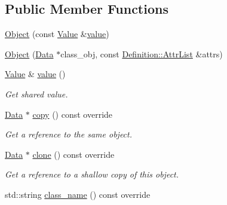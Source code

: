 \subsection*{Public Member Functions}
\begin{DoxyCompactItemize}
\item 
\hyperlink{classcreek_1_1_object_acdd6c54b973ad7facea8426ec61fbc57}{Object} (const \hyperlink{classcreek_1_1_object_a108b9fdd2bfa34e220bf80cec8523313}{Value} \&\hyperlink{classcreek_1_1_object_aa9d14828cbd16f6e9e338fc94a14b87e}{value})
\item 
\hyperlink{classcreek_1_1_object_ab527c5c11e555c6ea2a28eaaae134916}{Object} (\hyperlink{classcreek_1_1_data}{Data} $\ast$class\+\_\+obj, const \hyperlink{structcreek_1_1_object_1_1_definition_a0c8683f346c620b025f8f7297fd414f8}{Definition\+::\+Attr\+List} \&attrs)
\item 
\hyperlink{classcreek_1_1_object_a108b9fdd2bfa34e220bf80cec8523313}{Value} \& \hyperlink{classcreek_1_1_object_aa9d14828cbd16f6e9e338fc94a14b87e}{value} ()\hypertarget{classcreek_1_1_object_aa9d14828cbd16f6e9e338fc94a14b87e}{}\label{classcreek_1_1_object_aa9d14828cbd16f6e9e338fc94a14b87e}

\begin{DoxyCompactList}\small\item\em Get shared value. \end{DoxyCompactList}\item 
\hyperlink{classcreek_1_1_data}{Data} $\ast$ \hyperlink{classcreek_1_1_object_a0243ca862749f5bbf17e4e429f3f7ea7}{copy} () const  override\hypertarget{classcreek_1_1_object_a0243ca862749f5bbf17e4e429f3f7ea7}{}\label{classcreek_1_1_object_a0243ca862749f5bbf17e4e429f3f7ea7}

\begin{DoxyCompactList}\small\item\em Get a reference to the same object. \end{DoxyCompactList}\item 
\hyperlink{classcreek_1_1_data}{Data} $\ast$ \hyperlink{classcreek_1_1_object_a4a885365e22ec66aa1513cd3df6853a4}{clone} () const  override\hypertarget{classcreek_1_1_object_a4a885365e22ec66aa1513cd3df6853a4}{}\label{classcreek_1_1_object_a4a885365e22ec66aa1513cd3df6853a4}

\begin{DoxyCompactList}\small\item\em Get a reference to a shallow copy of this object. \end{DoxyCompactList}\item 
std\+::string \hyperlink{classcreek_1_1_object_a94a1e51b66a8099bcc4fb4ab48847f4c}{class\+\_\+name} () const  override\hypertarget{classcreek_1_1_object_a94a1e51b66a8099bcc4fb4ab48847f4c}{}\label{classcreek_1_1_object_a94a1e51b66a8099bcc4fb4ab48847f4c}


\end{DoxyCompactItemize}
